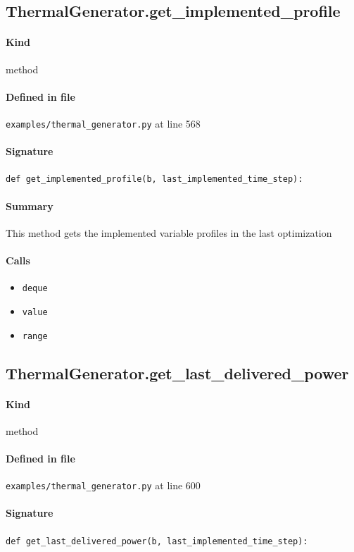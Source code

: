 \documentclass[11pt]{report}
\begin{document}
\subsection{ThermalGenerator.get\_implemented\_profile}
\label{def:examples-thermal_generator.py:ThermalGenerator.get_implemented_profile:L568}
\paragraph{Kind} method
\paragraph{Defined in file} \texttt{examples/thermal\_generator.py} at line 568
\paragraph{Signature} \texttt{def get\_implemented\_profile(b, last\_implemented\_time\_step):}
\paragraph{Summary} This method gets the implemented variable profiles in the last optimization
\paragraph{Calls}
\begin{itemize}[leftmargin=*]
  \item \texttt{deque}
  \item \texttt{value}
  \item \texttt{range}
\end{itemize}
\subsection{ThermalGenerator.get\_last\_delivered\_power}
\label{def:examples-thermal_generator.py:ThermalGenerator.get_last_delivered_power:L600}
\paragraph{Kind} method
\paragraph{Defined in file} \texttt{examples/thermal\_generator.py} at line 600
\paragraph{Signature} \texttt{def get\_last\_delivered\_power(b, last\_implemented\_time\_step):}
\end{document}
